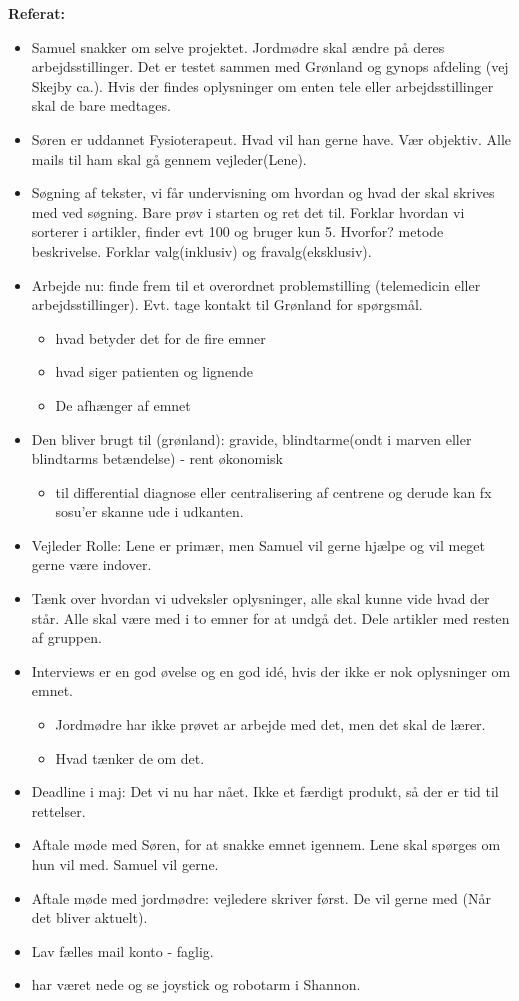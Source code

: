 \textbf{Referat:}
\begin{itemize}
	\item Samuel snakker om selve projektet. Jordmødre skal ændre på deres arbejdsstillinger. 
	Det er testet sammen med Grønland og gynops afdeling (vej Skejby ca.). Hvis der findes oplysninger om enten tele eller arbejdsstillinger skal de bare medtages. 
	\item Søren er uddannet Fysioterapeut. Hvad vil han gerne have. Vær objektiv.  Alle mails til ham skal gå gennem vejleder(Lene). 
	\item Søgning af tekster, vi får undervisning om hvordan og hvad der skal skrives med ved søgning. Bare prøv i starten og ret det til. 
	Forklar hvordan vi sorterer i artikler, finder evt 100 og bruger kun 5. Hvorfor? metode beskrivelse. Forklar valg(inklusiv) og fravalg(eksklusiv). 
	\item Arbejde nu: finde frem til et overordnet problemstilling (telemedicin eller arbejdsstillinger). Evt. tage kontakt til Grønland for spørgsmål. 
	\begin{itemize}
		\item hvad betyder det for de fire emner
		\item hvad siger patienten og lignende 
		\item De afhænger af emnet
	\end{itemize}   
	\item Den bliver brugt til (grønland): gravide, blindtarme(ondt i marven eller blindtarms betændelse) - rent økonomisk 
	\begin{itemize}
		\item til differential diagnose eller centralisering af centrene og derude kan fx sosu'er skanne ude i udkanten.
	\end{itemize} 
	\item Vejleder Rolle: Lene er primær, men Samuel vil gerne hjælpe og vil meget gerne være indover. 
	\item Tænk over hvordan vi udveksler oplysninger,  alle skal kunne vide hvad der står. Alle skal være med i to emner for at undgå det. Dele artikler med resten af gruppen. 
	\item Interviews er en god øvelse og en god idé, hvis der ikke er nok oplysninger om emnet. 
	\begin{itemize}
		\item Jordmødre har ikke prøvet ar arbejde med det, men det skal de lærer. 
		\item Hvad tænker de om det. 
	\end{itemize}
	\item Deadline i maj: Det vi nu har nået. Ikke et færdigt produkt, så der er tid til rettelser.
	\item Aftale møde med Søren, for at snakke emnet igennem. Lene skal spørges om hun vil med. Samuel vil gerne. 
	\item Aftale møde med jordmødre: vejledere skriver først. De vil gerne med (Når det bliver aktuelt). 
	\item Lav fælles mail konto - faglig. 
	\item har været nede og se joystick og robotarm i Shannon.  
\end{itemize}

\newpage


